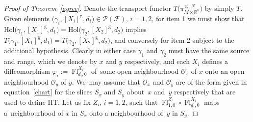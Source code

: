 \documentclass[pdftex]{sigma}
\numberwithin{equation}{section}
\def\g{\operatorname{g}}
\def\Fl{\operatorname{Fl}}
\def\FF{{\mathcal{F}}}
\def\PP{{\mathcal{P}}}
\def\OO{{\mathcal{O}}}
\def\RB{{\mathbb{R}}}
\begin{document}
\begin{proof}[Proof of Theorem~\ref{agree}]
Denote the transport functor $T\big(\pi_{M\times\RB^{n}}^{\g,\FF}\big)$ by simply $T$. Given ele\-ments $\big(\gamma_{i},[X_{i}]^{\g},d_{i}\big)\in\PP(\FF)$, $i = 1,2$, for item 1 we must show that $\text{Hol}\big(\gamma_{1},[X_{1}]^{\g},d_{1}\big) = \text{Hol}\big(\gamma_{2},[X_{2}]^{\g},d_{2}\big)$ implies $T\big(\gamma_{1},[X_{1}]^{\g},d_{1}\big) = T\big(\gamma_{2},[X_{2}]^{\g},d_{2}\big)$, and conversely for item 2 subject to the additional hypothesis. Clearly in either case $\gamma_{1}$ and $\gamma_{2}$ must have the same source and range, which we denote by $x$ and $y$ respectively, and each $X_{i}$ defines a diffeomorphism $\varphi_{i}:=\Fl^{X_{i}}_{d_{i},0}$ of~some open neighbourhood $\OO_{x}$ of $x$ onto an open neighbourhood $\OO_{y}$ of $y$. We~may assume that $\OO_{x}$ and $\OO_{y}$ are of the form given in equation~\eqref{chart} for the slices $S_{x}$ and $S_{y}$ about~$x$ and~$y$ respectively that are used to define HT. Let us fix $Z_{i}$, $i=1,2$, such that $\Fl^{Z_{i}}_{1,0}\circ\Fl^{X_{i}}_{d_{i},0}$ maps a~neighbourhood of $x$ in $S_{x}$ onto a neighbourhood of~$y$ in $S_{y}$.


\end{proof}
\end{document}
